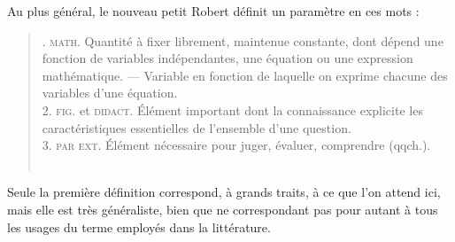\documentclass[12pt, a4paper, oneside]{book}
\begin{document}
	Au plus général, le nouveau petit Robert définit un paramètre en ces mots :
	\begin{quote}
		. \textsc{math.} Quantité à fixer librement, maintenue constante, dont dépend une fonction de variables indépendantes, une équation ou une expression mathématique. --- Variable en fonction de laquelle on exprime chacune des variables d'une équation.\\
		2. \textsc{fig.} et \textsc{didact.} Élément important dont la connaissance explicite les caractéristiques essentielles de l'ensemble d'une question.\\
		3. \textsc{par ext.} Élément nécessaire pour juger, évaluer, comprendre (qqch.).\fg{}\\
		\mbox{}~ \hfill \autocite[\textbf{Paramètre}]{robert_nouveau_1993}
	\end{quote}


	Seule la première définition correspond, à grands traits, à ce que l'on attend ici, mais elle est très généraliste, bien que ne correspondant pas pour autant à tous les usages du terme employés dans la littérature.
	
\end{document}
